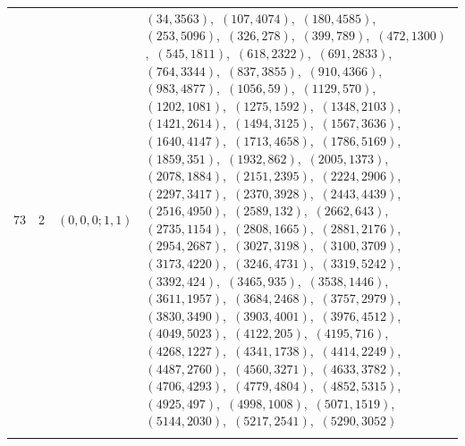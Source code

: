 \documentclass[11pt]{article}
\begin{document}
\begin{longtable}{@{}rrl>{\raggedright\arraybackslash}p{}@{}}
73 & 2 & $(0,0,0;1,1)$ & $(34,3563)$,\allowbreak\ $(107,4074)$,\allowbreak\ $(180,4585)$,\allowbreak\ $(253,5096)$,\allowbreak\ $(326,278)$,\allowbreak\ $(399,789)$,\allowbreak\ $(472,1300)$,\allowbreak\ $(545,1811)$,\allowbreak\ $(618,2322)$,\allowbreak\ $(691,2833)$,\allowbreak\ $(764,3344)$,\allowbreak\ $(837,3855)$,\allowbreak\ $(910,4366)$,\allowbreak\ $(983,4877)$,\allowbreak\ $(1056,59)$,\allowbreak\ $(1129,570)$,\allowbreak\ $(1202,1081)$,\allowbreak\ $(1275,1592)$,\allowbreak\ $(1348,2103)$,\allowbreak\ $(1421,2614)$,\allowbreak\ $(1494,3125)$,\allowbreak\ $(1567,3636)$,\allowbreak\ $(1640,4147)$,\allowbreak\ $(1713,4658)$,\allowbreak\ $(1786,5169)$,\allowbreak\ $(1859,351)$,\allowbreak\ $(1932,862)$,\allowbreak\ $(2005,1373)$,\allowbreak\ $(2078,1884)$,\allowbreak\ $(2151,2395)$,\allowbreak\ $(2224,2906)$,\allowbreak\ $(2297,3417)$,\allowbreak\ $(2370,3928)$,\allowbreak\ $(2443,4439)$,\allowbreak\ $(2516,4950)$,\allowbreak\ $(2589,132)$,\allowbreak\ $(2662,643)$,\allowbreak\ $(2735,1154)$,\allowbreak\ $(2808,1665)$,\allowbreak\ $(2881,2176)$,\allowbreak\ $(2954,2687)$,\allowbreak\ $(3027,3198)$,\allowbreak\ $(3100,3709)$,\allowbreak\ $(3173,4220)$,\allowbreak\ $(3246,4731)$,\allowbreak\ $(3319,5242)$,\allowbreak\ $(3392,424)$,\allowbreak\ $(3465,935)$,\allowbreak\ $(3538,1446)$,\allowbreak\ $(3611,1957)$,\allowbreak\ $(3684,2468)$,\allowbreak\ $(3757,2979)$,\allowbreak\ $(3830,3490)$,\allowbreak\ $(3903,4001)$,\allowbreak\ $(3976,4512)$,\allowbreak\ $(4049,5023)$,\allowbreak\ $(4122,205)$,\allowbreak\ $(4195,716)$,\allowbreak\ $(4268,1227)$,\allowbreak\ $(4341,1738)$,\allowbreak\ $(4414,2249)$,\allowbreak\ $(4487,2760)$,\allowbreak\ $(4560,3271)$,\allowbreak\ $(4633,3782)$,\allowbreak\ $(4706,4293)$,\allowbreak\ $(4779,4804)$,\allowbreak\ $(4852,5315)$,\allowbreak\ $(4925,497)$,\allowbreak\ $(4998,1008)$,\allowbreak\ $(5071,1519)$,\allowbreak\ $(5144,2030)$,\allowbreak\ $(5217,2541)$,\allowbreak\ $(5290,3052)$\\
\addlinespace[3pt]

\end{longtable}
\end{document}
